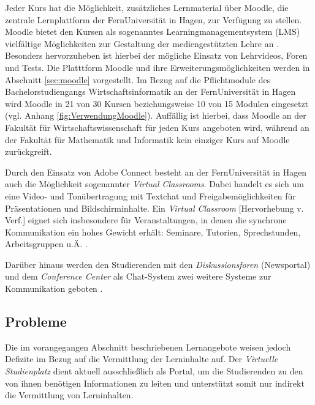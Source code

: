 Jeder Kurs hat die Möglichkeit, zusätzliches Lernmaterial über Moodle, die zentrale Lernplattform der FernUniversität in Hagen, zur Verfügung zu stellen. Moodle bietet den Kursen \glqq als sogenanntes Learningmanagementsystem (LMS) vielfältige Möglichkeiten zur Gestaltung der mediengestützten Lehre an\grqq{} \citep{fernuniversitaet2018moodle}. Besonders hervorzuheben ist hierbei der mögliche Einsatz von Lehrvideos, Foren und Tests. Die Platttform Moodle und ihre Erweiterungsmöglichkeiten werden in Abschnitt \ref{sec:moodle} vorgestellt. Im Bezug auf die Pflichtmodule des Bachelorstudiengangs Wirtschaftsinformatik an der FernUniversität in Hagen wird Moodle in 21 von 30 Kursen beziehungsweise 10 von 15 Modulen eingesetzt (vgl. Anhang \ref{fig:VerwendungMoodle}). Auffällig ist hierbei, dass Moodle an der Fakultät für Wirtschaftswissenschaft für jeden Kurs angeboten wird, während an der Fakultät für Mathematik und Informatik kein einziger Kurs auf Moodle zurückgreift.

Durch den Einsatz von Adobe Connect besteht an der FernUniversität in Hagen auch die Möglichkeit sogenannter \textit{Virtual Classrooms}. Dabei handelt es sich um eine Video- und Tonübertragung mit Textchat und Freigabemöglichkeiten für Präsentationen und Bildschirminhalte. \glqq Ein \emph{Virtual Classroom} [Hervorhebung v. Verf.] eignet sich insbesondere für Veranstaltungen, in denen die synchrone Kommunikation ein hohes Gewicht erhält: Seminare, Tutorien, Sprechstunden, Arbeitsgruppen u.Ä.\grqq{} \citep{fernuniversitaet2018kommunikationstools}.

Darüber hinaus werden den Studierenden mit den \textit{Diskussionsforen} (Newsportal) und dem \textit{Conference Center} als Chat-System zwei weitere Systeme zur Kommunikation geboten \citep{fernuniversitaet2018kommunikationstools}.


\subsection{Probleme}
Die im vorangegangen Abschnitt beschriebenen Lernangebote weisen jedoch Defizite im Bezug auf die Vermittlung der Lerninhalte auf. Der \textit{Virtuelle Studienplatz} dient aktuell ausschließlich als Portal, um die Studierenden zu den von ihnen benötigen Informationen zu leiten und unterstützt somit nur indirekt die Vermittlung von Lerninhalten.

